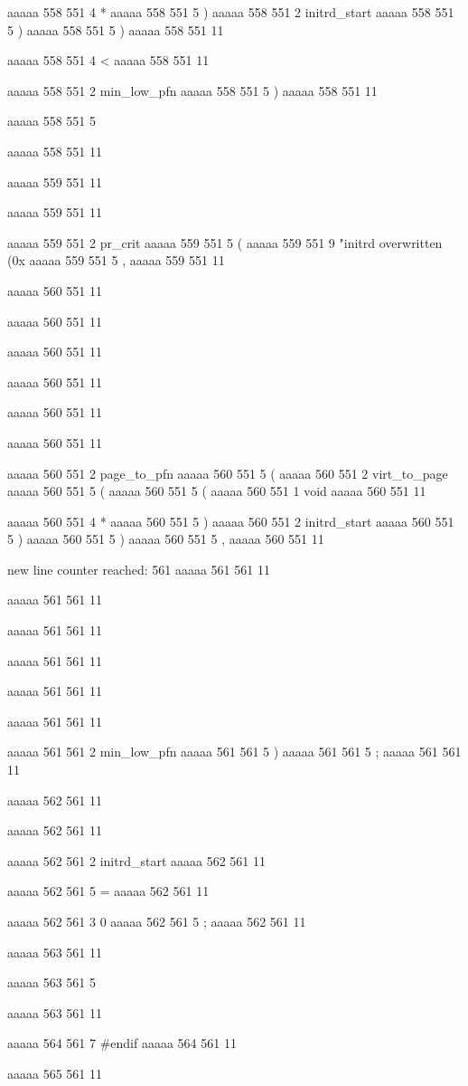 {aaaaa 558 551
4
*
aaaaa 558 551
5
)
aaaaa 558 551
2
initrd_start
aaaaa 558 551
5
)
aaaaa 558 551
5
)
aaaaa 558 551
11
 
aaaaa 558 551
4
<
aaaaa 558 551
11
 
aaaaa 558 551
2
min_low_pfn
aaaaa 558 551
5
)
aaaaa 558 551
11
 
aaaaa 558 551
5
{
aaaaa 558 551
11


aaaaa 559 551
11
	
aaaaa 559 551
11
	
aaaaa 559 551
2
pr_crit
aaaaa 559 551
5
(
aaaaa 559 551
9
"initrd overwritten (0x%
aaaaa 559 551
5
,
aaaaa 559 551
11


aaaaa 560 551
11
	
aaaaa 560 551
11
	
aaaaa 560 551
11
 
aaaaa 560 551
11
 
aaaaa 560 551
11
 
aaaaa 560 551
11
 
aaaaa 560 551
2
page_to_pfn
aaaaa 560 551
5
(
aaaaa 560 551
2
virt_to_page
aaaaa 560 551
5
(
aaaaa 560 551
5
(
aaaaa 560 551
1
void
aaaaa 560 551
11
 
aaaaa 560 551
4
*
aaaaa 560 551
5
)
aaaaa 560 551
2
initrd_start
aaaaa 560 551
5
)
aaaaa 560 551
5
)
aaaaa 560 551
5
,
aaaaa 560 551
11


new line counter reached: 561
aaaaa 561 561
11
	
aaaaa 561 561
11
	
aaaaa 561 561
11
 
aaaaa 561 561
11
 
aaaaa 561 561
11
 
aaaaa 561 561
11
 
aaaaa 561 561
2
min_low_pfn
aaaaa 561 561
5
)
aaaaa 561 561
5
;
aaaaa 561 561
11


aaaaa 562 561
11
	
aaaaa 562 561
11
	
aaaaa 562 561
2
initrd_start
aaaaa 562 561
11
 
aaaaa 562 561
5
=
aaaaa 562 561
11
 
aaaaa 562 561
3
0
aaaaa 562 561
5
;
aaaaa 562 561
11


aaaaa 563 561
11
	
aaaaa 563 561
5
}
aaaaa 563 561
11


aaaaa 564 561
7
#endif
aaaaa 564 561
11


aaaaa 565 561
11
	
}
